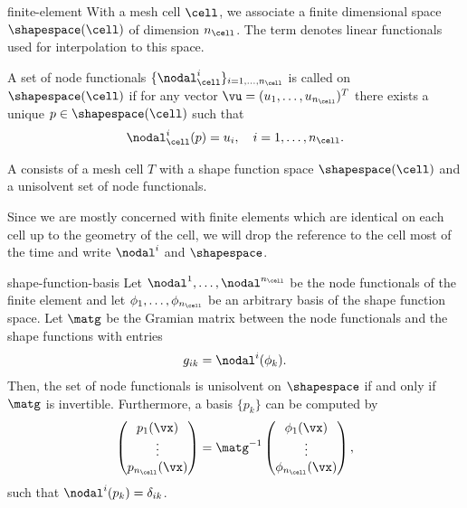 \begin{Definition}{finite-element}
  With a mesh cell $\cell$, we associate a finite dimensional
   space $\shapespace(\cell)$ of dimension
  $n_\cell$. The term  denotes linear
  functionals used for interpolation to this space.

  A set of node functionals $\{\nodal_\cell^i\}_{i=1,\dots,n_\cell}$ is called
   on $\shapespace(\cell)$ if for any vector
  $\vu = (u_1,\dots,u_{n_\cell})^T$ there exists a unique
  $p\in \shapespace(\cell)$ such that
  \begin{gather}
    \nodal_\cell^i(p) = u_i,\quad i=1,\dots,n_\cell.
  \end{gather}

  A  consists of a mesh cell $T$ with a shape
  function space $\shapespace(\cell)$ and a unisolvent set of node
  functionals.
\end{Definition}

\begin{intro}
  Since we are mostly concerned with finite elements which are
  identical on each cell up to the geometry of the cell, we will drop
  the reference to the cell most of the time and write $\nodal^i$ and
  $\shapespace$.
\end{intro}

\begin{Lemma}{shape-function-basis}
  Let $\nodal^1,\dots,\nodal^{n_{\cell}}$ be the node functionals of the
  finite element and let $\phi_1,\dots,\phi_{n_{\cell}}$ be an arbitrary
  basis of the shape function space.  Let $\matg$ be the Gramian matrix
  between the node functionals and the shape functions with entries
  \begin{gather}
    g_{ik} = \nodal^i(\phi_k).
  \end{gather}
  Then, the set of node functionals is unisolvent on $\shapespace$ if
  and only if $\matg$ is invertible. Furthermore, a
  basis $\{p_k\}$ can be computed by
  \begin{gather}
    \begin{pmatrix}
      p_1(\vx)\\\vdots\\p_{n_{\cell}}(\vx)
    \end{pmatrix}
    = \matg^{-1}
    \begin{pmatrix}
      \phi_1(\vx)\\\vdots\\\phi_{n_{\cell}}(\vx)
    \end{pmatrix},
  \end{gather}
  such that $\nodal^i(p_k) = \delta_{ik}$.
\end{Lemma}


